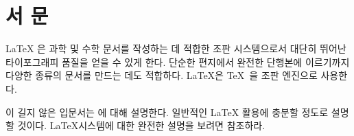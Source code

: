 

\chapter{서 문}

\LaTeX{} \cite{manual}은 과학 및 수학 문서를 작성하는 데 적합한 조판 시스템으로서 대단히 뛰어난 타이포그래피 품질을 얻을 수 있게 한다. 단순한 편지에서 완전한 단행본에 이르기까지 다양한 종류의 문서를 만드는 데도 적합하다.
\LaTeX 은 \TeX\ \cite{texbook}을 조판 엔진으로 사용한다.

이 길지 않은 입문서는 \LaTeXe 에 대해 설명한다. 일반적인 \LaTeX{} 활용에 충분할 정도로 
설명할 것이다. \LaTeX 시스템에 대한 완전한 설명을 보려면 \cite{manual, companion}\를 참조하라.

